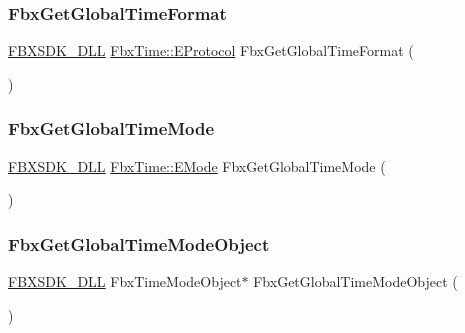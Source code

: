 \subsubsection{\texorpdfstring{Fbx\+Get\+Global\+Time\+Format}{FbxGetGlobalTimeFormat}}
{\footnotesize\ttfamily \hyperlink{fbxarch_8h_a25d1298b33c31da5dbed969e0d4b4bc1}{F\+B\+X\+S\+D\+K\+\_\+\+D\+LL} \hyperlink{class_fbx_time_a10ffa1fdce0aa7f63ec24bdd23afff4b}{Fbx\+Time\+::\+E\+Protocol} Fbx\+Get\+Global\+Time\+Format (\begin{DoxyParamCaption}{ }\end{DoxyParamCaption})\hspace{0.3cm}{\ttfamily [friend]}}

\mbox{\label{class_fbx_time_a1dd5082c49e4cf431a4f0ed108acb9ed}} 
\subsubsection{\texorpdfstring{Fbx\+Get\+Global\+Time\+Mode}{FbxGetGlobalTimeMode}}
{\footnotesize\ttfamily \hyperlink{fbxarch_8h_a25d1298b33c31da5dbed969e0d4b4bc1}{F\+B\+X\+S\+D\+K\+\_\+\+D\+LL} \hyperlink{class_fbx_time_acc529b00a0e8d4c3da3702449ca93031}{Fbx\+Time\+::\+E\+Mode} Fbx\+Get\+Global\+Time\+Mode (\begin{DoxyParamCaption}{ }\end{DoxyParamCaption})\hspace{0.3cm}{\ttfamily [friend]}}

\mbox{\label{class_fbx_time_a0d2b00c87c206774bfa262d0d3c7880c}} 
\subsubsection{\texorpdfstring{Fbx\+Get\+Global\+Time\+Mode\+Object}{FbxGetGlobalTimeModeObject}}
{\footnotesize\ttfamily \hyperlink{fbxarch_8h_a25d1298b33c31da5dbed969e0d4b4bc1}{F\+B\+X\+S\+D\+K\+\_\+\+D\+LL} Fbx\+Time\+Mode\+Object$\ast$ Fbx\+Get\+Global\+Time\+Mode\+Object (\begin{DoxyParamCaption}{ }\end{DoxyParamCaption})\hspace{0.3cm}{\ttfamily [friend]}}


